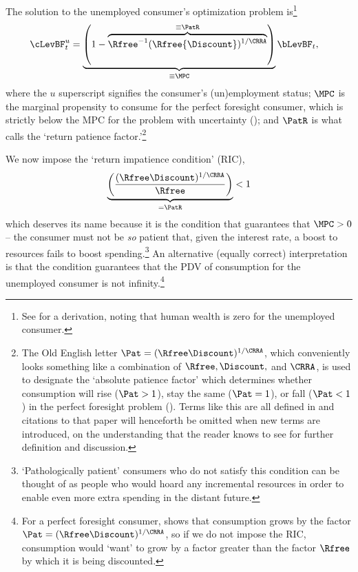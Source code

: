 \documentclass{\handout}
\begin{document}
\renewcommand{\MPCU}{\MPC} %
The solution to the unemployed consumer's optimization problem
is\footnote{See  for a derivation, noting that human wealth is zero for the unemployed consumer.} 
\begin{equation}\begin{gathered}\begin{aligned}
        \cLevBF^{u}_{t} & =  \underbrace{\left(1-\overbrace{\Rfree ^{-1}(\Rfree{\Discount})^{1/\CRRA}}^{\equiv \PatR}\right)}_{\equiv \MPCU} \bLevBF_{t} \label{eq:cpfinfhorunemp} %
,
\end{aligned}\end{gathered}\end{equation}
where the $u$ superscript signifies the consumer's (un)employment
status; $\MPCU$ is the marginal propensity to consume for the perfect
foresight consumer, which is strictly below the MPC for the problem
with uncertainty (\cite{carroll&kimball:concavity}); and $\PatR$ is
what \cite{BufferStockTheory} calls the `return patience factor.'\footnote{The Old English letter $\Pat = (\Rfree \Discount)^{1/\CRRA}$, which conveniently looks something like a combination of $\Rfree, \Discount, $ and $\CRRA$, is used to designate the `absolute patience factor' which determines whether consumption will rise ($\Pat > 1$), stay the same ($\Pat = 1$), or fall ($\Pat < 1$) in the perfect foresight problem ().  Terms like this are all defined in \cite{carrollBSTheory} and citations to that paper will henceforth be omitted when new terms are introduced, on the understanding that the reader knows to see \cite{carrollBSTheory} for further definition and discussion.}


\indent We now impose the `return impatience condition' (RIC),
\begin{equation}\begin{gathered}\begin{aligned}
  \underbrace{\left(\frac{(\Rfree \Discount)^{1/\CRRA}}{\Rfree}\right)}_{= \PatR} < 1 \label{eq:RIC}
\end{aligned}\end{gathered}\end{equation}
which deserves its name because it is the condition that guarantees that $\MPCU
> 0$ -- the consumer must not be {\it so} patient that, given the interest rate, a boost to
resources fails to boost spending.\footnote{`Pathologically patient' consumers who do not satisfy this condition can be thought of as people who would hoard any incremental resources in order to enable even more extra spending in the distant future.}
An alternative (equally correct)
interpretation is that the condition guarantees that the PDV of
consumption for the unemployed consumer is not infinity.\footnote{For a perfect
foresight consumer,  shows that consumption grows by the factor
$\Pat = (\Rfree\Discount)^{1/\CRRA}$, so if we do not impose the RIC, consumption would `want' to grow by
a factor greater than the factor $\Rfree$ by which it is being
discounted.}  
\end{document}
